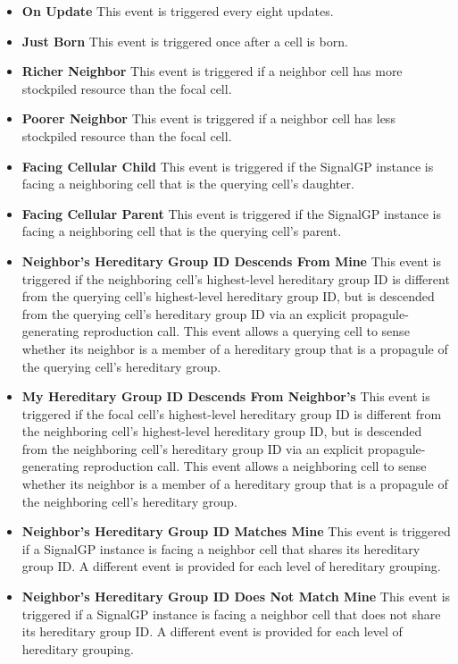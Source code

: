 \begin{itemize}
\item \textbf{On Update}
This event is triggered every eight updates.
\item \textbf{Just Born}
This event is triggered once after a cell is born.
\item \textbf{Richer Neighbor}
This event is triggered if a neighbor cell has more stockpiled resource than the focal cell.
\item \textbf{Poorer Neighbor}
This event is triggered if a neighbor cell has less stockpiled resource than the focal cell.
\item \textbf{Facing Cellular Child}
This event is triggered if the SignalGP instance is facing a neighboring cell that is the querying cell's daughter.
\item \textbf{Facing Cellular Parent}
This event is triggered if the SignalGP instance is facing a neighboring cell that is the querying cell's parent.
\item \textbf{Neighbor's Hereditary Group ID Descends From Mine}
This event is triggered if the neighboring cell's highest-level hereditary group ID is different from the querying cell's highest-level hereditary group ID, but is descended from the querying cell's hereditary group ID via an explicit propagule-generating reproduction call.
This event allows a querying cell to sense whether its neighbor is a member of a hereditary group that is a propagule of the querying cell's hereditary group.
\item \textbf{My Hereditary Group ID Descends From Neighbor's}
This event is triggered if the focal cell's highest-level hereditary group ID is different from the neighboring cell's highest-level hereditary group ID, but is descended from the neighboring cell's hereditary group ID via an explicit propagule-generating reproduction call.
This event allows a neighboring cell to sense whether its neighbor is a member of a hereditary group that is a propagule of the neighboring cell's hereditary group.
\item \textbf{Neighbor's Hereditary Group ID Matches Mine}
This event is triggered if a SignalGP instance is facing a neighbor cell that shares its hereditary group ID.
A different event is provided for each level of hereditary grouping.
\item \textbf{Neighbor's Hereditary Group ID Does Not Match Mine}
This event is triggered if a SignalGP instance is facing a neighbor cell that does not share its hereditary group ID.
A different event is provided for each level of hereditary grouping.

\end{itemize}
